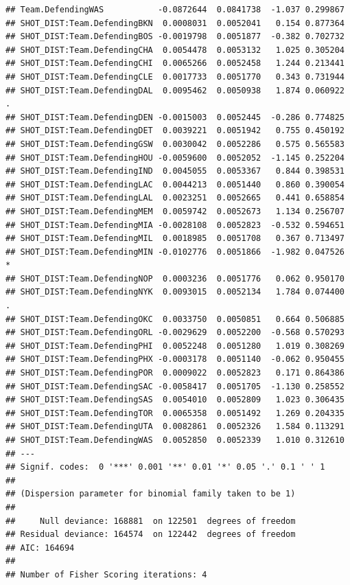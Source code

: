 \documentclass[
]{book}
\theoremstyle{definition}
\theoremstyle{definition}
\theoremstyle{definition}
\theoremstyle{definition}
\theoremstyle{remark}
\begin{document}
\begin{verbatim}
## Team.DefendingWAS           -0.0872644  0.0841738  -1.037 0.299867    
## SHOT_DIST:Team.DefendingBKN  0.0008031  0.0052041   0.154 0.877364    
## SHOT_DIST:Team.DefendingBOS -0.0019798  0.0051877  -0.382 0.702732    
## SHOT_DIST:Team.DefendingCHA  0.0054478  0.0053132   1.025 0.305204    
## SHOT_DIST:Team.DefendingCHI  0.0065266  0.0052458   1.244 0.213441    
## SHOT_DIST:Team.DefendingCLE  0.0017733  0.0051770   0.343 0.731944    
## SHOT_DIST:Team.DefendingDAL  0.0095462  0.0050938   1.874 0.060922 .  
## SHOT_DIST:Team.DefendingDEN -0.0015003  0.0052445  -0.286 0.774825    
## SHOT_DIST:Team.DefendingDET  0.0039221  0.0051942   0.755 0.450192    
## SHOT_DIST:Team.DefendingGSW  0.0030042  0.0052286   0.575 0.565583    
## SHOT_DIST:Team.DefendingHOU -0.0059600  0.0052052  -1.145 0.252204    
## SHOT_DIST:Team.DefendingIND  0.0045055  0.0053367   0.844 0.398531    
## SHOT_DIST:Team.DefendingLAC  0.0044213  0.0051440   0.860 0.390054    
## SHOT_DIST:Team.DefendingLAL  0.0023251  0.0052665   0.441 0.658854    
## SHOT_DIST:Team.DefendingMEM  0.0059742  0.0052673   1.134 0.256707    
## SHOT_DIST:Team.DefendingMIA -0.0028108  0.0052823  -0.532 0.594651    
## SHOT_DIST:Team.DefendingMIL  0.0018985  0.0051708   0.367 0.713497    
## SHOT_DIST:Team.DefendingMIN -0.0102776  0.0051866  -1.982 0.047526 *  
## SHOT_DIST:Team.DefendingNOP  0.0003236  0.0051776   0.062 0.950170    
## SHOT_DIST:Team.DefendingNYK  0.0093015  0.0052134   1.784 0.074400 .  
## SHOT_DIST:Team.DefendingOKC  0.0033750  0.0050851   0.664 0.506885    
## SHOT_DIST:Team.DefendingORL -0.0029629  0.0052200  -0.568 0.570293    
## SHOT_DIST:Team.DefendingPHI  0.0052248  0.0051280   1.019 0.308269    
## SHOT_DIST:Team.DefendingPHX -0.0003178  0.0051140  -0.062 0.950455    
## SHOT_DIST:Team.DefendingPOR  0.0009022  0.0052823   0.171 0.864386    
## SHOT_DIST:Team.DefendingSAC -0.0058417  0.0051705  -1.130 0.258552    
## SHOT_DIST:Team.DefendingSAS  0.0054010  0.0052809   1.023 0.306435    
## SHOT_DIST:Team.DefendingTOR  0.0065358  0.0051492   1.269 0.204335    
## SHOT_DIST:Team.DefendingUTA  0.0082861  0.0052326   1.584 0.113291    
## SHOT_DIST:Team.DefendingWAS  0.0052850  0.0052339   1.010 0.312610    
## ---
## Signif. codes:  0 '***' 0.001 '**' 0.01 '*' 0.05 '.' 0.1 ' ' 1
## 
## (Dispersion parameter for binomial family taken to be 1)
## 
##     Null deviance: 168881  on 122501  degrees of freedom
## Residual deviance: 164574  on 122442  degrees of freedom
## AIC: 164694
## 
## Number of Fisher Scoring iterations: 4
\end{verbatim}
\end{document}
